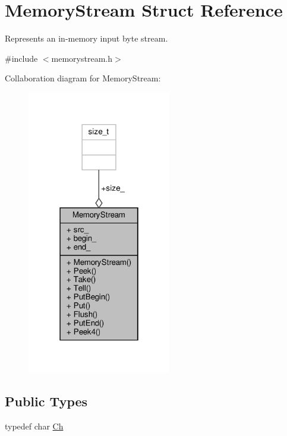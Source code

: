 \hypertarget{structMemoryStream}{}\section{Memory\+Stream Struct Reference}
\label{structMemoryStream}


Represents an in-\/memory input byte stream.  




{\ttfamily \#include $<$memorystream.\+h$>$}



Collaboration diagram for Memory\+Stream\+:
\nopagebreak
\begin{figure}[H]
\begin{center}
\leavevmode
\includegraphics[width=178pt]{structMemoryStream__coll__graph}
\end{center}
\end{figure}
\subsection*{Public Types}
\begin{DoxyCompactItemize}
\item 
typedef char \hyperlink{structMemoryStream_a62a1cbd052c325c83dbdb387d2f89088}{Ch}
\end{DoxyCompactItemize}
